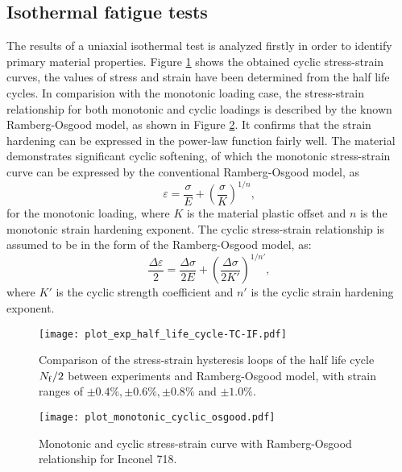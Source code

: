 \subsection{Isothermal fatigue tests}
\noindent
The results of a uniaxial isothermal test is analyzed firstly in order to identify primary material properties. Figure \ref{Fig:plot_exp_half_life_cycle} shows the obtained cyclic stress-strain curves, the values of stress and strain have been determined from the half life cycles. In comparision with the monotonic loading case, the stress-strain relationship for both monotonic and cyclic loadings is described by the known Ramberg-Osgood model, as shown in Figure \ref{Fig:plot_monotonic_cyclic_osgood}. It confirms that the strain hardening can be expressed in the power-law function fairly well. The material demonstrates significant cyclic softening, of which the monotonic stress-strain curve can be expressed by the conventional Ramberg-Osgood model, as
\begin{equation}
{\varepsilon } = \frac{{\sigma }}{{E}} + {\left( {\frac{{\sigma }}{{K}}} \right)^{1/n}},
\end{equation}
for the monotonic loading, where $K$ is the material plastic offset and $n$ is the monotonic strain hardening exponent.
The cyclic stress-strain relationship is assumed to be in the form of the Ramberg-Osgood model, as:
\begin{equation}
\frac{{\Delta \varepsilon }}{2} = \frac{{\Delta \sigma }}{{2E}} + {\left( {\frac{{\Delta \sigma }}{{2K'}}} \right)^{1/n'}},
\end{equation}
where $K'$ is the cyclic strength coefficient and $n'$ is the cyclic strain hardening exponent.

\begin{figure}[!htp]
\centering
\texttt{[image: plot\_exp\_half\_life\_cycle-TC-IF.pdf]}
\caption{Comparison of the stress-strain hysteresis loops of the half life cycle $N_{\rm f}/2$ between experiments and Ramberg-Osgood model, with strain ranges of $\pm0.4\%, \pm0.6\%, \pm0.8\%$ and $\pm1.0\%$.}
\label{Fig:plot_exp_half_life_cycle}
\end{figure}

\begin{figure}[!htp]
\centering
\texttt{[image: plot\_monotonic\_cyclic\_osgood.pdf]}
\caption{Monotonic and cyclic stress-strain curve with Ramberg-Osgood relationship for Inconel 718.}
\label{Fig:plot_monotonic_cyclic_osgood}
\end{figure}


